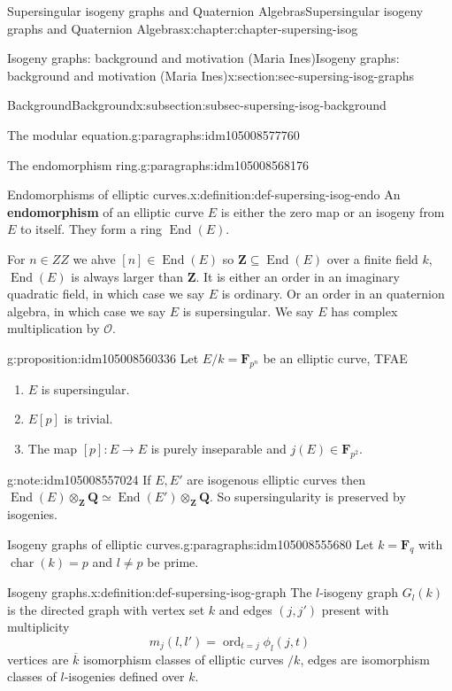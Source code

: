 \documentclass[oneside,10pt,]{book}
\newcommand{\terminology}[1]{\textbf{#1}}
\numberwithin{equation}{section}
\newcommand{\lb}{[}
\newcommand{\rb}{]}
\newcommand{\ZZ}{\mathbf{Z}}
\newcommand{\QQ}{\mathbf{Q}}
\newcommand{\FF}{\mathbf{F}}
\newcommand{\ints}{\mathcal{O}}
\DeclareMathOperator{\End}{End}
\DeclareMathOperator{\characteristic}{char}
\DeclareMathOperator{\ord}{ord}
\begin{document}
\begin{chapterptx}{Supersingular isogeny graphs and Quaternion Algebras}{}{Supersingular isogeny graphs and Quaternion Algebras}{}{}{x:chapter:chapter-supersing-isog}
\begin{sectionptx}{Isogeny graphs: background and motivation (Maria Ines)}{}{Isogeny graphs: background and motivation (Maria Ines)}{}{}{x:section:sec-supersing-isog-graphs}
\begin{subsectionptx}{Background}{}{Background}{}{}{x:subsection:subsec-supersing-isog-background}
\begin{paragraphs}{The modular equation.}{g:paragraphs:idm105008577760}
\end{paragraphs}%
\begin{paragraphs}{The endomorphism ring.}{g:paragraphs:idm105008568176}%
\begin{definition}{Endomorphisms of elliptic curves.}{x:definition:def-supersing-isog-endo}%
An \terminology{endomorphism} of an elliptic curve \(E\) is either the zero map or an isogeny from \(E\) to itself. They form a ring \(\End(E)\).%
\end{definition}
For \(n \in ZZ\) we ahve \(\lb n \rb \in \End(E)\) so \(\ZZ \subseteq \End(E)\) over a finite field \(k\), \(\End(E)\) is always larger than \(\ZZ\). It is either an order in an imaginary quadratic field, in which case we say \(E\) is ordinary. Or an order in an quaternion algebra, in which case we say \(E\) is supersingular. We say \(E\) has complex multiplication by \(\ints\).%
\begin{proposition}{}{}{g:proposition:idm105008560336}%
Let \(E/k = \FF_{p^n}\) be an elliptic curve, TFAE%
\begin{enumerate}
\item{}\(E\) is supersingular.%
\item{}\(E\lb p\rb\) is trivial.%
\item{}The map \(\lb p\rb \colon E\to E\) is purely inseparable and \(j(E) \in \FF_{p^2}\).%
\end{enumerate}
%
\end{proposition}
\begin{note}{}{g:note:idm105008557024}%
If \(E,E'\) are isogenous elliptic curves then \(\End(E) \otimes_\ZZ \QQ \simeq \End(E')\otimes_\ZZ \QQ\). So supersingularity is preserved by isogenies.%
\end{note}
\end{paragraphs}%
\begin{paragraphs}{Isogeny graphs of elliptic curves.}{g:paragraphs:idm105008555680}%
Let \(k = \FF_q\) with \(\characteristic(k) = p\) and \(l \ne p \) be prime.%
\begin{definition}{Isogeny graphs.}{x:definition:def-supersing-isog-graph}%
The \(l\)-isogeny graph \(G_l(k)\) is the directed graph with vertex set \(k\) and edges \((j,j')\) present with multiplicity%
\begin{equation*}
m_j(l,l') = \ord_{t=j} \phi_l(j,t)
\end{equation*}
vertices are \(\overline k\) isomorphism classes of  elliptic curves \(/k\), edges are isomorphism classes of \(l\)-isogenies defined over \(k\).%
\end{definition}

\end{paragraphs}
\end{subsectionptx}
\end{sectionptx}
\end{chapterptx}
\end{document}
